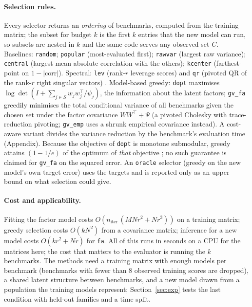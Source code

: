 \paragraph{Selection rules.}
Every selector returns an \emph{ordering} of benchmarks, computed from the training matrix; the subset for budget $k$ is the first $k$ entries that the new model can run, so subsets are nested in $k$ and the same code serves any observed set $C$.
Baselines: \texttt{random}; \texttt{popular} (most-evaluated first); \texttt{rawvar} (largest raw variance); \texttt{central} (largest mean absolute correlation with the others); \texttt{kcenter} (farthest-point on $1-|\mathrm{corr}|$).
Spectral: \texttt{lev} (rank-$r$ leverage scores) and \texttt{qr} (pivoted QR of the rank-$r$ right singular vectors) \citep{mahoney2009cur}.
Model-based greedy: \texttt{dopt} maximises $\log\det(I+\sum_{j\in S}w_jw_j^\top/\psi_j)$, the information about the latent factors; \texttt{gv\_fa} greedily minimises the total conditional variance of all benchmarks given the chosen set under the factor covariance $WW^\top+\Psi$ (a pivoted Cholesky with trace-reduction pivoting; \texttt{gv\_emp} uses a shrunk empirical covariance instead). A cost-aware variant divides the variance reduction by the benchmark's evaluation time (Appendix). Because the objective of \texttt{dopt} is monotone submodular, greedy attains $(1-1/e)$ of the optimum of \emph{that} objective \citep{nemhauser1978analysis}; no such guarantee is claimed for \texttt{gv\_fa} on the squared error.
An \texttt{oracle} selector (greedy on the new model's own target error) uses the targets and is reported only as an upper bound on what selection could give.

\paragraph{Cost and applicability.}
Fitting the factor model costs $O(n_{\mathrm{iter}}\,(M N r^2 + N r^3))$ on a training matrix; greedy selection costs $O(kN^2)$ from a covariance matrix; inference for a new model costs $O(kr^2+Nr)$ for \texttt{fa}. All of this runs in seconds on a CPU for the matrices here; the cost that matters to the evaluator is running the $k$ benchmarks. The methods need a training matrix with enough models per benchmark (benchmarks with fewer than 8 observed training scores are dropped), a shared latent structure between benchmarks, and a new model drawn from a population the training models represent; Section~\ref{sec:exp} tests the last condition with held-out families and a time split.

